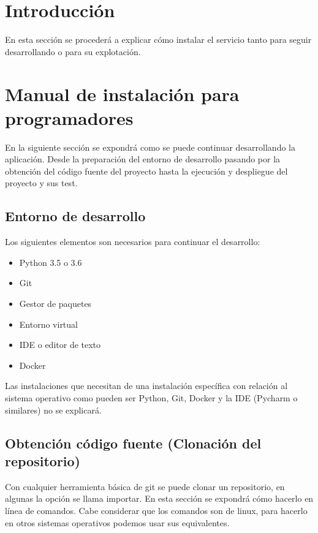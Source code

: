 
\section{Introducción}

En esta sección se procederá a explicar cómo instalar el servicio tanto para seguir desarrollando o para su explotación.


\section{Manual de instalación para programadores}

En la siguiente sección se expondrá como se puede continuar desarrollando la aplicación. Desde la preparación del entorno de desarrollo pasando por la obtención del código fuente del proyecto hasta la ejecución y despliegue del proyecto y sus test.


\subsection{Entorno de desarrollo}

Los siguientes elementos son necesarios para continuar el desarrollo:

\begin{itemize}
\setlength{\itemsep}{1pt}
\setlength{\parskip}{0pt}
\setlength{\parsep}{0pt}
\item Python 3.5 o 3.6 \cite{py}
\item Git \cite{git}
\item Gestor de paquetes \cite{pip}
\item Entorno virtual \cite{venv}
\item IDE o editor de texto
\item Docker \cite{dock}
\end{itemize}

Las instalaciones que necesitan de una instalación específica con relación al sistema operativo como pueden ser Python, Git, Docker y la IDE (Pycharm o similares) no se explicará. 


\subsection{Obtención código fuente (Clonación del repositorio)}

Con cualquier herramienta básica de git se puede clonar un repositorio, en algunas la opción se llama importar. En esta sección se expondrá cómo hacerlo en línea de comandos. Cabe considerar que los comandos son de linux, para hacerlo en otros sistemas operativos podemos usar sus equivalentes.

